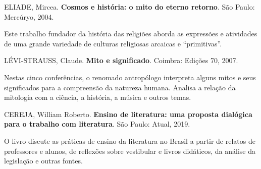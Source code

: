 \documentclass[12pt]{extarticle}
\begin{document}
ELIADE, Mircea. \textbf{Cosmos e história: o mito do eterno retorno}.
São Paulo: Mercúryo, 2004.

Este trabalho fundador da história das religiões aborda as expressões e
atividades de uma grande variedade de culturas religiosas arcaicas e
``primitivas''.

LÉVI-STRAUSS, Claude. \textbf{Mito e significado}. Coimbra: Edições 70,
2007.

Nestas cinco conferências, o renomado antropólogo interpreta alguns
mitos e seus significados para a compreensão da natureza humana. Analisa
a relação da mitologia com a ciência, a história, a música e outros
temas.

CEREJA, William Roberto. \textbf{Ensino de literatura: uma proposta
dialógica para o trabalho com literatura}. São Paulo: Atual, 2019.

O livro discute as práticas de ensino da literatura no Brasil a partir
de relatos de professores e alunos, de reflexões sobre vestibular e
livros didáticos, da análise da legislação e outras fontes.
\end{document}
